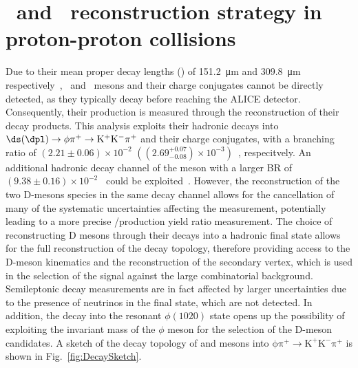 \chapter{\texorpdfstring{\ds\ and \dpl\ reconstruction strategy in proton-proton collisions}{Ds+ and D+ reconstruction strategy in proton-proton collisions}}\label{chap:reconstruction}

\begin{sloppypar}
Due to their mean proper decay lengths (\ct) of \SI{151.2}{\micro\meter} and \SI{309.8}{\micro\meter} respectively~\cite{pdg}, \ds\ and \dpl\ mesons and their charge conjugates cannot be directly detected, as they typically decay before reaching the ALICE detector. Consequently, their production is measured through the reconstruction of their decay products. This analysis exploits their hadronic decays into $\ds (\dpl) \rightarrow \mathrm{\phi\pi^+ \rightarrow K^+K^-\pi^+}$ and their charge conjugates, with a branching ratio of $(2.21\pm0.06)\times10^{-2}$ \mbox{$\left((2.69^{+0.07}_{-0.08})\times10^{-3}\right)$}~\cite{pdg}, respecitvely. An additional hadronic decay channel of the \dpl meson with a larger BR of \mbox{$(9.38\pm0.16)\times10^{-2}$}~\cite{pdg} could be exploited~\cite{ALICE:2017olh}. However, the reconstruction of the two D-mesons species in the same decay channel allows for the cancellation of many of the systematic uncertainties affecting the measurement, potentially leading to a more precise \ds/\dpl production yield ratio measurement. The choice of reconstructing D mesons through their decays into a hadronic final state allows for the full reconstruction of the decay topology, therefore providing access to the D-meson kinematics and the reconstruction of the secondary vertex, which is used in the selection of the signal against the large combinatorial background. Semileptonic decay measurements are in fact affected by larger uncertainties due to the presence of neutrinos in the final state, which are not detected. In addition, the decay into the resonant $\phi(1020)$ state opens up the possibility of exploiting the invariant mass of the $\phi$ meson for the selection of the D-meson candidates. A sketch of the decay topology of \ds and \dpl mesons into $\mathrm{\phi\pi^+ \rightarrow K^+K^-\pi^+}$ is shown in Fig.~\ref{fig:DecaySketch}.
\end{sloppypar}


